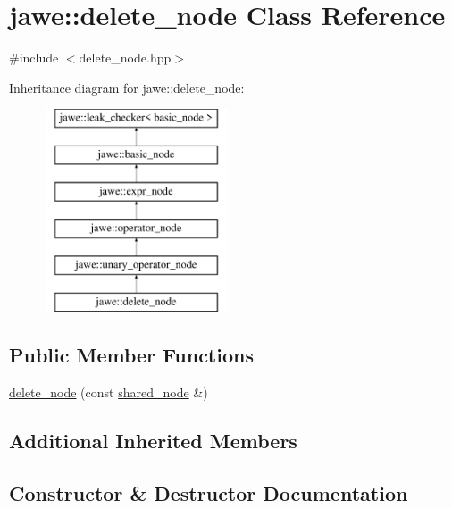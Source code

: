 \hypertarget{classjawe_1_1delete__node}{}\section{jawe\+:\+:delete\+\_\+node Class Reference}
\label{classjawe_1_1delete__node}


{\ttfamily \#include $<$delete\+\_\+node.\+hpp$>$}

Inheritance diagram for jawe\+:\+:delete\+\_\+node\+:\begin{figure}[H]
\begin{center}
\leavevmode
\includegraphics[height=6.000000cm]{classjawe_1_1delete__node}
\end{center}
\end{figure}
\subsection*{Public Member Functions}
\begin{DoxyCompactItemize}
\item 
\hyperlink{classjawe_1_1delete__node_a1b8bbb517992af65a52250cffa6602c5}{delete\+\_\+node} (const \hyperlink{namespacejawe_a3f307481d921b6cbb50cc8511fc2b544}{shared\+\_\+node} \&)
\end{DoxyCompactItemize}
\subsection*{Additional Inherited Members}


\subsection{Constructor \& Destructor Documentation}
\mbox{\label{classjawe_1_1delete__node_a1b8bbb517992af65a52250cffa6602c5}} 
